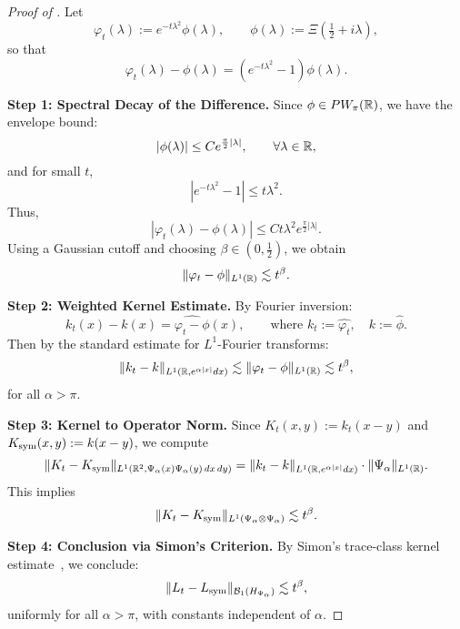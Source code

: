 \begin{proof}[Proof of ]
Let
\[
\varphi_t(\lambda) := e^{-t\lambda^2} \phi(\lambda), \qquad \phi(\lambda) := \Xi\left( \tfrac{1}{2} + i\lambda \right),
\]
so that
\[
\varphi_t(\lambda) - \phi(\lambda) = (e^{-t\lambda^2} - 1)\phi(\lambda).
\]

\smallskip
\noindent\textbf{Step 1: Spectral Decay of the Difference.}  
Since \( \phi \in PW_\pi(\mathbb{R}) \), we have the envelope bound:
\[
|\phi(\lambda)| \le C e^{\frac{\pi}{2} |\lambda|}, \qquad \forall \lambda \in \mathbb{R},
\]
and for small \( t \),
\[
|e^{-t\lambda^2} - 1| \le t \lambda^2.
\]
Thus,
\[
|\varphi_t(\lambda) - \phi(\lambda)| \le C t \lambda^2 e^{\frac{\pi}{2}|\lambda|}.
\]
Using a Gaussian cutoff and choosing \( \beta \in (0, \tfrac{1}{2}) \), we obtain
\[
\| \varphi_t - \phi \|_{L^1(\mathbb{R})} \lesssim t^\beta.
\]

\smallskip
\noindent\textbf{Step 2: Weighted Kernel Estimate.}  
By Fourier inversion:
\[
k_t(x) - k(x) = \widehat{\varphi_t - \phi}(x), \qquad \text{where } k_t := \widehat{\varphi_t}, \quad k := \widehat{\phi}.
\]
Then by the standard estimate for \( L^1 \)-Fourier transforms:
\[
\| k_t - k \|_{L^1(\mathbb{R}, e^{\alpha |x|} dx)} \lesssim \| \varphi_t - \phi \|_{L^1(\mathbb{R})} \lesssim t^\beta,
\]
for all \( \alpha > \pi \).

\smallskip
\noindent\textbf{Step 3: Kernel to Operator Norm.}  
Since \( K_t(x,y) := k_t(x - y) \) and \( K_{\mathrm{sym}}(x,y) := k(x - y) \), we compute
\[
\| K_t - K_{\mathrm{sym}} \|_{L^1(\mathbb{R}^2, \Psi_\alpha(x) \Psi_\alpha(y)\, dx\, dy)}
= \| k_t - k \|_{L^1(\mathbb{R}, e^{\alpha |x|} dx)} \cdot \| \Psi_\alpha \|_{L^1(\mathbb{R})}.
\]
This implies
\[
\| K_t - K_{\mathrm{sym}} \|_{L^1(\Psi_\alpha \otimes \Psi_\alpha)} \lesssim t^\beta.
\]

\smallskip
\noindent\textbf{Step 4: Conclusion via Simon’s Criterion.}  
By Simon’s trace-class kernel estimate~\cite[Thm.~4.2]{Simon2005TraceIdeals}, we conclude:
\[
\| L_t - L_{\mathrm{sym}} \|_{\mathcal{B}_1(H_{\Psi_\alpha})} \lesssim t^\beta,
\]
uniformly for all \( \alpha > \pi \), with constants independent of \( \alpha \).
\end{proof}
